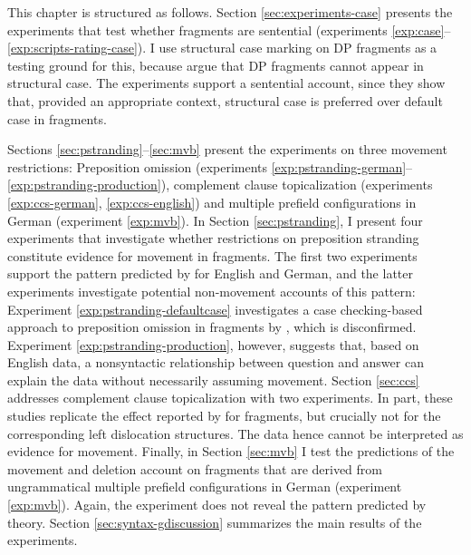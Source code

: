 This chapter is structured as follows. Section \ref{sec:experiments-case} presents the experiments that test whether fragments are sentential (experiments \ref{exp:case}--\ref{exp:scripts-rating-case}). I use structural case marking on DP fragments as a testing ground for this, because \citet{barton.progovac2005} argue that DP fragments cannot appear in structural case. The experiments support a sentential account, since they show that, provided an appropriate context, structural case is preferred over default case in fragments.

\noindent Sections \ref{sec:pstranding}--\ref{sec:mvb} present the experiments on three movement restrictions: Pre\-position omission (experiments \ref{exp:pstranding-german}--\ref{exp:pstranding-production}), complement clause topicalization (experiments \ref{exp:ccs-german}, \ref{exp:ccs-english}) and multiple prefield configurations in German (experiment \ref{exp:mvb}). In Section \ref{sec:pstranding}, I present four experiments that investigate whether restrictions on preposition stranding constitute evidence for movement in fragments. The first two experiments support the pattern predicted by \citet{merchant2004} for English and German, and the latter experiments investigate potential non-movement accounts of this pattern: Experiment \ref{exp:pstranding-defaultcase} investigates a case checking-based approach to preposition omission in fragments by \citet{progovac.etal2006}, which is disconfirmed. Experiment \ref{exp:pstranding-production}, however, suggests that, based on English data, a nonsyntactic relationship between question and answer can explain the data without necessarily assuming movement. Section \ref{sec:ccs} addresses complement clause topicalization with two experiments. In part, these studies replicate the effect reported by \citet{merchant.etal2013} for fragments, but crucially not for the corresponding left dislocation structures. The data hence cannot be interpreted as evidence for movement. Finally, in Section \ref{sec:mvb} I test the predictions of the movement and deletion account on fragments that are derived from ungrammatical multiple prefield configurations in German (experiment \ref{exp:mvb}). Again, the experiment does not reveal the pattern predicted by  theory. Section \ref{sec:syntax-gdiscussion} summarizes the main results of the experiments. 

